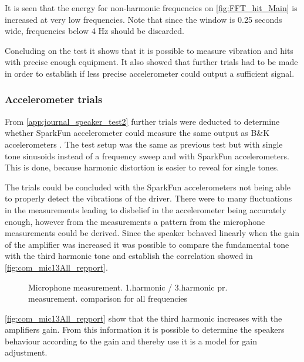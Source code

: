 %


It is seen that the energy for non-harmonic frequencies on \autoref{fig:FFT_hit_Main} is increased at very low frequencies. %
Note that since the window is 0.25 seconds wide, frequencies below 4 Hz should be discarded.

Concluding on the test it shows that it is possible to measure vibration and hits with precise enough equipment. It also showed that further trials had to be made in order to establish if less precise accelerometer could output a sufficient signal.

\subsubsection{Accelerometer trials}

From \autoref{app:journal_speaker_test2} further trials were deducted to determine whether SparkFun accelerometer could measure the same output as B\&K accelerometers . The test setup was the same as previous test but with single tone sinusoids instead of a frequency sweep and with SparkFun accelerometers. This is done, because harmonic distortion is easier to reveal for single tones. %

The trials could be concluded with the SparkFun accelerometers not being able to properly detect the vibrations of the driver. There were to many fluctuations in the measurements leading to disbelief in the accelerometer being accurately enough, however from the measurements a pattern from the microphone measurements could be derived. Since the speaker behaved linearly when the gain of the amplifier was increased it was possible to compare the fundamental tone with the third harmonic tone and establish the correlation showed in \autoref{fig:com_mic13All_repport}.

\begin{figure}[H]
    \centering
    
    \caption{Microphone measurement. 1.harmonic / 3.harmonic pr. measurement. comparison for all frequencies}
\label{fig:com_mic13All_repport}
\end{figure}  

\autoref{fig:com_mic13All_repport} show that the third harmonic increases with the amplifiers gain. From this information it is possible to determine the speakers behaviour according to the gain and thereby use it is a model for gain adjustment.


